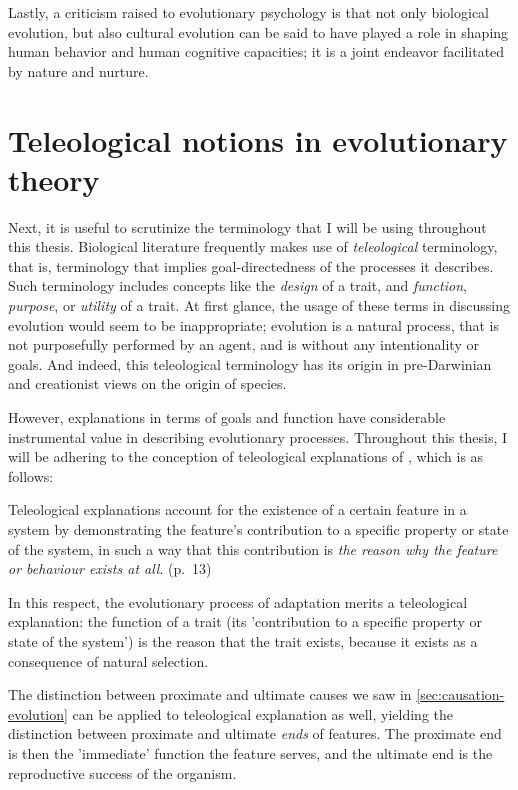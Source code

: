 Lastly, a criticism raised to evolutionary psychology is that not only biological evolution, but also cultural evolution can be said to have played a role in shaping human behavior and human cognitive capacities; it is a joint endeavor facilitated by nature and nurture.

\section{Teleological notions in evolutionary theory}
\label{sec:teleology}
Next, it is useful to scrutinize the terminology that I will be using throughout this thesis.
Biological literature frequently makes use of \emph{teleological} terminology, that is, terminology that implies goal-directedness of the processes it describes. Such terminology includes concepts like the \emph{design} of a trait, and \emph{function}, \emph{purpose}, or \emph{utility} of a trait.
At first glance, the usage of these terms in discussing evolution would seem to be inappropriate; evolution is a natural process, that is not purposefully performed by an agent, and is without any intentionality or goals. And indeed, this teleological terminology has its origin in pre-Darwinian and creationist views on the origin of species.

However, explanations in terms of goals and function have considerable instrumental value in describing evolutionary processes. Throughout this thesis, I will be adhering to the conception of teleological explanations of \citet{Ayala99}, which is as follows:
\begin{quoting}
    Teleological explanations account for the existence of a certain feature in a system by demonstrating the feature’s contribution to a specific property or state of the system, in such a way that this contribution is \emph{the reason why the feature or behaviour exists at all}.
    \hfill (p.~13)
\end{quoting}
In this respect, the evolutionary process of adaptation merits a teleological explanation: the function of a trait (its 'contribution to a specific property or state of the system') is the reason that the trait exists, because it exists as a consequence of natural selection.

The distinction between proximate and ultimate causes we saw in \cref{sec:causation-evolution} can be applied to teleological explanation as well, yielding the distinction between proximate and ultimate \emph{ends} of features. The proximate end is then the 'immediate' function the feature serves, and the ultimate end is the reproductive success of the organism.

